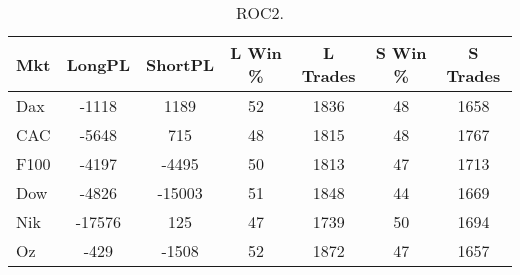 \begin{table}[ht]
\centering
\caption[ROC2]{ROC2.} 
\label{tab:mac_roc2_results}
\begin{tabular}{lcccccc}
  \toprule Mkt & LongPL & ShortPL & L Win \% & L Trades & S Win \% & S Trades \\ 
  \midrule Dax & -1118 & 1189 & 52 & 1836 & 48 & 1658 \\ 
  CAC & -5648 & 715 & 48 & 1815 & 48 & 1767 \\ 
  F100 & -4197 & -4495 & 50 & 1813 & 47 & 1713 \\ 
  Dow & -4826 & -15003 & 51 & 1848 & 44 & 1669 \\ 
  Nik & -17576 & 125 & 47 & 1739 & 50 & 1694 \\ 
  Oz & -429 & -1508 & 52 & 1872 & 47 & 1657 \\ 
   \bottomrule \end{tabular}
\end{table}
